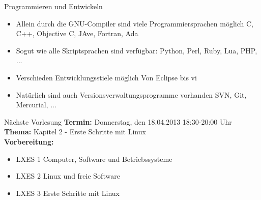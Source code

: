 \documentclass[aspectratio=43]{beamer}
\begin{document}
\begin{frame} 

	\begin{block}{Programmieren und Entwickeln} 
	\begin{itemize}
	\item Allein durch die GNU-Compiler sind viele Programmiersprachen möglich
	\newline C, C++, Objective C, JAve, Fortran, Ada
	\item Sogut wie alle Skriptsprachen sind verfügbar:
	\newline Python, Perl, Ruby, Lua, PHP, ...
	\item Verschieden Entwicklungsstiele möglich
	\newline Von Eclipse bis vi
	\item Natürlich sind auch Versionsverwaltungsprogramme vorhanden
	\newline SVN, Git, Mercurial, ...
	\end{itemize}

	\end{block}
	
\end{frame}


\begin{frame}[plain]
\begin{alertblock}{Nächste Vorlesung}
\textbf{Termin:} Donnerstag, den 18.04.2013 18:30-20:00 Uhr\\
\textbf{Thema:} Kapitel 2 - Erste Schritte mit Linux \\
\textbf{Vorbereitung:} 
\begin{itemize}
\item LXES 1 Computer, Software und Betriebssysteme
\item LXES 2 Linux und freie Software
\item LXES 3 Erste Schritte mit Linux
\end{itemize}
\end{alertblock}
\end{frame}

\materialframe
\end{document}
